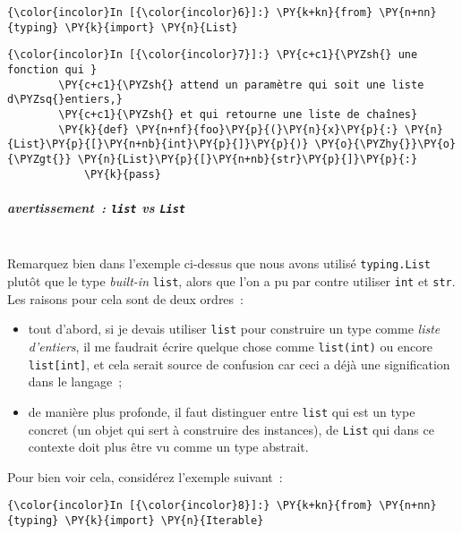     \begin{Verbatim}[commandchars=\\\{\}]
{\color{incolor}In [{\color{incolor}6}]:} \PY{k+kn}{from} \PY{n+nn}{typing} \PY{k}{import} \PY{n}{List}
\end{Verbatim}


    \begin{Verbatim}[commandchars=\\\{\}]
{\color{incolor}In [{\color{incolor}7}]:} \PY{c+c1}{\PYZsh{} une fonction qui }
        \PY{c+c1}{\PYZsh{} attend un paramètre qui soit une liste d\PYZsq{}entiers,}
        \PY{c+c1}{\PYZsh{} et qui retourne une liste de chaînes}
        \PY{k}{def} \PY{n+nf}{foo}\PY{p}{(}\PY{n}{x}\PY{p}{:} \PY{n}{List}\PY{p}{[}\PY{n+nb}{int}\PY{p}{]}\PY{p}{)} \PY{o}{\PYZhy{}}\PY{o}{\PYZgt{}} \PY{n}{List}\PY{p}{[}\PY{n+nb}{str}\PY{p}{]}\PY{p}{:}
            \PY{k}{pass}    
\end{Verbatim}


    \hypertarget{avertissement-list-vs-list}{%
\subparagraph{\texorpdfstring{avertissement~: \texttt{list} vs
\texttt{List}}{avertissement~: list vs List}\\\\}\label{avertissement-list-vs-list}}

    Remarquez bien dans l'exemple ci-dessus que nous avons utilisé
\texttt{typing.List} plutôt que le type \emph{built-in} \texttt{list},
alors que l'on a pu par contre utiliser \texttt{int} et \texttt{str}.\\

Les raisons pour cela sont de deux ordres~:

\begin{itemize}
\item
  tout d'abord, si je devais utiliser \texttt{list} pour construire un
  type comme \emph{liste d'entiers}, il me faudrait écrire quelque chose
  comme \texttt{list(int)} ou encore \texttt{list{[}int{]}}, et cela
  serait source de confusion car ceci a déjà une signification dans le
  langage~;
\item
  de manière plus profonde, il faut distinguer entre \texttt{list} qui
  est un type concret (un objet qui sert à construire des instances), de
  \texttt{List} qui dans ce contexte doit plus être vu comme un type
  abstrait.
\end{itemize}

    Pour bien voir cela, considérez l'exemple suivant~:

    \begin{Verbatim}[commandchars=\\\{\}]
{\color{incolor}In [{\color{incolor}8}]:} \PY{k+kn}{from} \PY{n+nn}{typing} \PY{k}{import} \PY{n}{Iterable}
\end{Verbatim}


